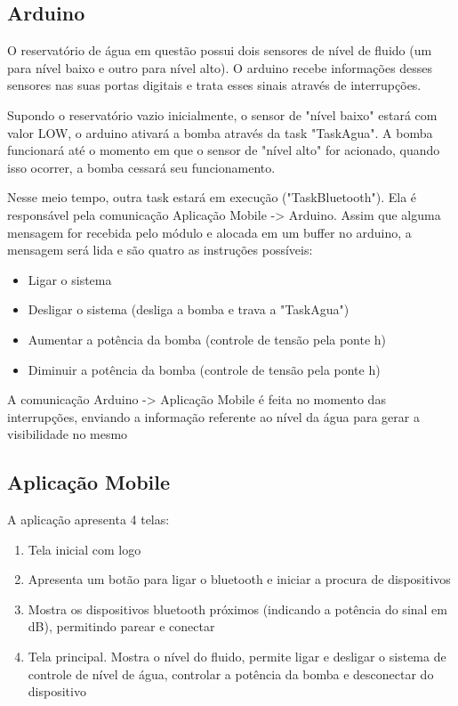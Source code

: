 \documentclass[12pt,a4paper]{article}
\begin{document}
\subsection{Arduino}
O reservatório de água em questão possui dois sensores de nível de fluido 
(um para nível baixo e outro para nível alto). O arduino recebe informações 
desses sensores nas suas portas digitais e trata esses sinais através de 
interrupções.

Supondo o reservatório vazio inicialmente, o sensor de "nível baixo" estará 
com valor LOW, o arduino ativará
a bomba através da task "TaskAgua". A bomba funcionará até o momento em que 
o sensor de "nível alto" for acionado, quando isso ocorrer, a bomba cessará 
seu funcionamento.

Nesse meio tempo, outra task estará em execução ("TaskBluetooth"). Ela é 
responsável pela comunicação Aplicação Mobile -> Arduino. Assim que alguma 
mensagem for recebida pelo módulo e alocada em um buffer no arduino, a mensagem
será lida e são quatro as instruções possíveis:
\begin{itemize}
\item Ligar o sistema
\item Desligar o sistema (desliga a bomba e trava a "TaskAgua")
\item Aumentar a potência da bomba (controle de tensão pela ponte h)
\item Diminuir a potência da bomba (controle de tensão pela ponte h)
\end{itemize}

A comunicação Arduino -> Aplicação Mobile é feita no momento das interrupções, 
enviando a informação referente ao nível da água para gerar a visibilidade no mesmo

\subsection{Aplicação Mobile}
A aplicação apresenta 4 telas:
\begin{enumerate}
    \item Tela inicial com logo
    \item Apresenta um botão para ligar o bluetooth e iniciar a procura de dispositivos
    \item Mostra os dispositivos bluetooth próximos (indicando a potência do sinal em dB), permitindo parear e conectar
    \item Tela principal. Mostra o nível do fluido, permite ligar e desligar o sistema de controle de nível de água, controlar a potência da bomba e desconectar do dispositivo
\end{enumerate}
\end{document}
